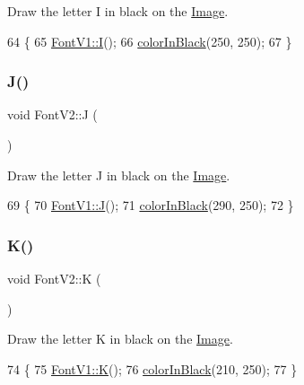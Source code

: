 Draw the letter I in black on the \mbox{\hyperlink{class_image}{Image}}. 


\begin{DoxyCode}
64                \{
65     \mbox{\hyperlink{class_font_v1_aab86d5ae867a26e0384c919f82f0bcf1}{FontV1::I}}();
66     \mbox{\hyperlink{class_font_v2_a04f2501961bc286ce70fbb6a840b0e8a}{colorInBlack}}(250, 250);
67 \}
\end{DoxyCode}
\mbox{\label{class_font_v2_a6cc91c88325f086dc95cd733ebda7849}} 
\subsubsection{\texorpdfstring{J()}{J()}}
{\footnotesize\ttfamily void Font\+V2\+::J (\begin{DoxyParamCaption}{ }\end{DoxyParamCaption})}



Draw the letter J in black on the \mbox{\hyperlink{class_image}{Image}}. 


\begin{DoxyCode}
69                \{
70     \mbox{\hyperlink{class_font_v1_a3fe315f13fd21c6dbd5f81113cd1c3f6}{FontV1::J}}();
71     \mbox{\hyperlink{class_font_v2_a04f2501961bc286ce70fbb6a840b0e8a}{colorInBlack}}(290, 250);
72 \}
\end{DoxyCode}
\mbox{\label{class_font_v2_a1871c49a753378d2f50ad91ea8b26c10}} 
\subsubsection{\texorpdfstring{K()}{K()}}
{\footnotesize\ttfamily void Font\+V2\+::K (\begin{DoxyParamCaption}{ }\end{DoxyParamCaption})}



Draw the letter K in black on the \mbox{\hyperlink{class_image}{Image}}. 


\begin{DoxyCode}
74                \{
75     \mbox{\hyperlink{class_font_v1_a45ed7d1ac12bd32f458b5b144dd132ba}{FontV1::K}}();
76     \mbox{\hyperlink{class_font_v2_a04f2501961bc286ce70fbb6a840b0e8a}{colorInBlack}}(210, 250);
77 \}
\end{DoxyCode}
\mbox{\label{class_font_v2_ae40068da683965bc711e752af9acf360}} 
